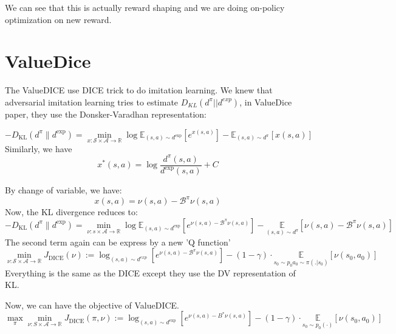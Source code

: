 \documentclass[a4paper]{article}
\theoremstyle{definition}
\begin{document}
We can see that this is actually reward shaping and we are doing on-policy optimization on new reward.

\section{ValueDice}
The ValueDICE use DICE trick to do imitation learning.
We knew that adversarial imitation learning tries to estimate $D_{KL}(d^{\pi}||d^{exp})$, in ValueDice paper, they use the Donsker-Varadhan representation:

\begin{equation}
-D_{\mathrm{KL}}\left(d^{\pi} \| d^{\mathrm{exp}}\right)=\min _{x: \mathcal{S} \times \mathcal{A} \rightarrow \mathbb{R}} \log \mathbb{E}_{(s, a) \sim d^{\mathrm{exp}}}\left[e^{x(s, a)}\right]-\mathbb{E}_{(s, a) \sim d^{\pi}}[x(s, a)]
\end{equation}
Similarly, we have
\begin{equation}
x^{*}(s, a)=\log \frac{d^{\pi}(s, a)}{d^{\exp }(s, a)}+C
\end{equation}

By change of variable, we have:
\begin{equation}
x(s, a)=\nu(s, a)-\mathcal{B}^{\pi} \nu(s, a)
\end{equation}
Now, the KL divergence reduces to:
\begin{equation}
-D_{\mathrm{KL}}\left(d^{\pi} \| d^{\mathrm{exp}}\right)=\min _{\nu: s \times \mathcal{A} \rightarrow \mathbb{R}}  \log \mathbb{E}_{(s, a) \sim d^{\mathrm{exp}}}\left[e^{\nu(s, a)-\mathcal{B}^{\pi} \nu(s, a)}\right]-\underset{(s, a) \sim d^{\pi}}{\mathbb{E}}\left[\nu(s, a)-\mathcal{B}^{\pi} \nu(s, a)\right]
\end{equation}
The second term again can be express by a new 'Q function'
\begin{equation}
\min _{\nu: \mathcal{S} \times \mathcal{A} \rightarrow \mathbb{R}} J_{\mathrm{DICE}}(\nu):=\log _{(s, a) \sim d^{exp}}\left[e^{\nu(s, a)-\mathcal{B}^{\pi} \nu(s, a)}\right]-(1-\gamma) \cdot \underset{s_{0} \sim p_{0} a_0 \sim \pi(.|s_0)}{\mathbb{E}}\left[\nu\left(s_{0}, a_{0}\right)\right]
\end{equation}
Everything is the same as the DICE except they use the DV representation of KL.

Now, we can have the objective of ValueDICE.
\begin{equation}
\max _{\pi} \min _{\nu: S \times \mathcal{A} \rightarrow \mathbb{R}} J_{\mathrm{DICE}}(\pi, \nu):=\log _{(s, a) \sim d^{\mathrm{exp}}}\left[e^{\nu(s, a)-B^{*} \nu(s, a)}\right]-(1-\gamma) \cdot \underset{s_{0} \sim p_{0}(\cdot)}{\mathbb{E}}\left[\nu\left(s_{0}, a_{0}\right)\right]
\end{equation}
\end{document}
